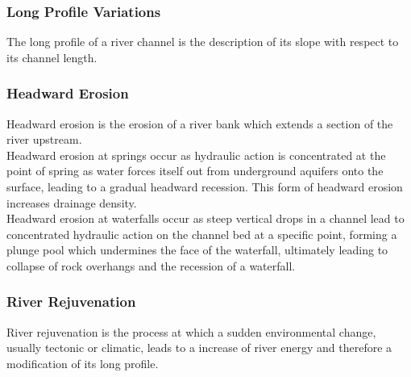 \documentclass[../../main]{subfiles}
\begin{document}
\subsubsection{Long Profile Variations}

	The long profile of a river channel is the description of its slope with respect to its channel length.

\subsubsection{Headward Erosion}

	Headward erosion is the erosion of a river bank which extends a section of the river upstream. \\

	Headward erosion at springs occur as hydraulic action is concentrated at the point of spring as water forces itself out from underground aquifers onto the surface, leading to a gradual headward recession. This form of headward erosion increases drainage density. \\

	Headward erosion at waterfalls occur as steep vertical drops in a channel lead to concentrated hydraulic action on the channel bed at a specific point, forming a plunge pool which undermines the face of the waterfall, ultimately leading to collapse of rock overhangs and the recession of a waterfall.

\subsubsection{River Rejuvenation}

	River rejuvenation is the process at which a sudden environmental change, usually tectonic or climatic, leads to a increase of river energy and therefore a modification of its long profile.
\end{document}
